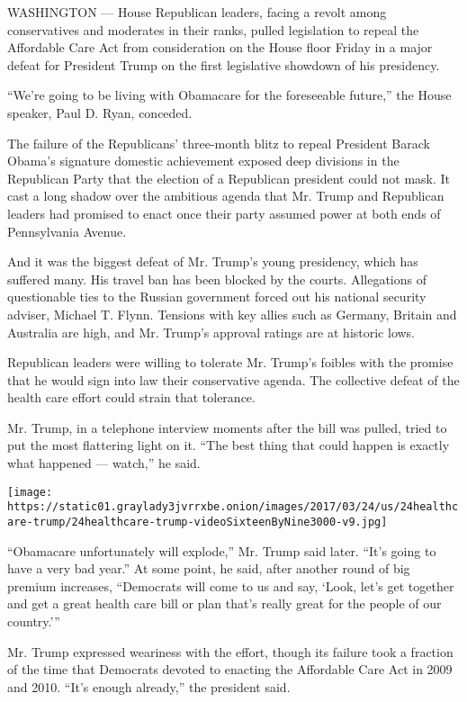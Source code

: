 WASHINGTON --- House Republican leaders, facing a revolt among
conservatives and moderates in their ranks, pulled legislation to repeal
the Affordable Care Act from consideration on the House floor Friday in
a major defeat for President Trump on the first legislative showdown of
his presidency.

``We're going to be living with Obamacare for the foreseeable future,''
the House speaker, Paul D. Ryan, conceded.

The failure of the Republicans' three-month blitz to repeal President
Barack Obama's signature domestic achievement exposed deep divisions in
the Republican Party that the election of a Republican president could
not mask. It cast a long shadow over the ambitious agenda that Mr. Trump
and Republican leaders had promised to enact once their party assumed
power at both ends of Pennsylvania Avenue.

And it was the biggest defeat of Mr. Trump's young presidency, which has
suffered many. His travel ban has been blocked by the courts.
Allegations of questionable ties to the Russian government forced out
his national security adviser, Michael T. Flynn. Tensions with key
allies such as Germany, Britain and Australia are high, and Mr. Trump's
approval ratings are at historic lows.

Republican leaders were willing to tolerate Mr. Trump's foibles with the
promise that he would sign into law their conservative agenda. The
collective defeat of the health care effort could strain that tolerance.

Mr. Trump, in a telephone interview moments after the bill was pulled,
tried to put the most flattering light on it. ``The best thing that
could happen is exactly what happened --- watch,'' he said.

\texttt{[image: https://static01.graylady3jvrrxbe.onion/images/2017/03/24/us/24healthcare-trump/24healthcare-trump-videoSixteenByNine3000-v9.jpg]}

``Obamacare unfortunately will explode,'' Mr. Trump said later. ``It's
going to have a very bad year.'' At some point, he said, after another
round of big premium increases, ``Democrats will come to us and say,
`Look, let's get together and get a great health care bill or plan
that's really great for the people of our country.'''

Mr. Trump expressed weariness with the effort, though its failure took a
fraction of the time that Democrats devoted to enacting the Affordable
Care Act in 2009 and 2010. ``It's enough already,'' the president said.

